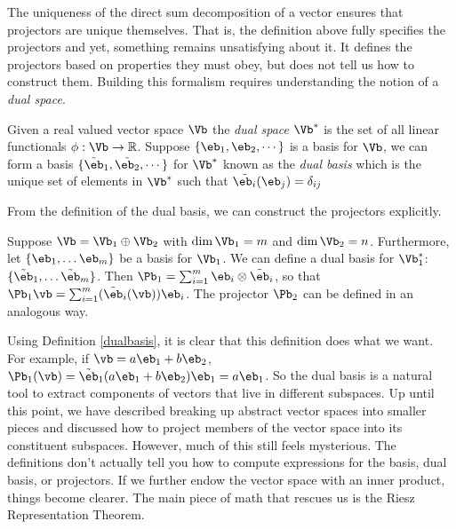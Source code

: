 \documentclass{article}
\begin{document}
The uniqueness of the direct sum decomposition of a vector ensures that projectors are unique themselves. That is, the definition above fully specifies the projectors and yet, something remains unsatisfying about it. It defines the projectors based on properties they must obey, but does not tell us how to construct them. Building this formalism requires understanding the notion of a \textit{dual space}. 

\begin{definition}\label{dualbasis}
    Given a real valued vector space $\Vb$ the \textit{dual space} $\Vb^*$ is the set of all linear functionals $\phi: \Vb \to \mathbb{R}$. Suppose $\{\eb_1, \eb_2, \cdots\}$ is a basis for $\Vb$, we can form a basis $\{\tilde{\eb}_1, \tilde{\eb_2}, \cdots\}$ for $\Vb^*$ known as the \textit{dual basis} which is the unique set of elements in $\Vb^*$ such that $\tilde{\eb_i}(\eb_j) = \delta_{ij}$
\end{definition}

From the definition of the dual basis, we can construct the projectors explicitly. 

\begin{prop}
    Suppose $\Vb = \Vb_1 \oplus \Vb_2$ with $\dim\Vb_1 = m$ and $\dim\Vb_2 = n$. Furthermore, let $\{\eb_1, \dots \eb_m\}$ be a basis for $\Vb_1$. We can define a dual basis for $\Vb_1^*$: $\{\tilde{\eb}_1, \dots \tilde{\eb}_m\}$. Then $\Pb_1 = \sum_{i=1}^m \eb_i \otimes \tilde{\eb}_i$, so that $\Pb_1 \vb = \sum_{i=1}^m (\tilde{\eb}_i(\vb)) \eb_i$. The projector $\Pb_2$ can be defined in an analogous way.
\end{prop}

Using Definition \ref{dualbasis}, it is clear that this definition does what we want. For example, if $\vb = a\eb_1 + b \eb_2$, $\Pb_1(\vb) = \tilde{\eb}_1( a\eb_1 + b \eb_2)\eb_1 = a\eb_1$. So the dual basis is a natural tool to extract components of vectors that live in different subspaces. Up until this point, we have described breaking up abstract vector spaces into smaller pieces and discussed how to project members of the vector space into its constituent subspaces. However, much of this still feels mysterious. The definitions don't actually tell you how to compute expressions for the basis, dual basis, or projectors. If we further endow the vector space with an inner product, things become clearer. The main piece of math that rescues us is the Riesz Representation Theorem. 
\end{document}
